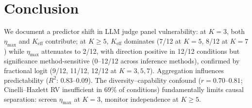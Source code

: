\section{Conclusion}

We document a predictor shift in LLM judge panel vulnerability: at $K{=}3$, both $\eta_{\max}$ and $K_{\mathrm{eff}}$ contribute; at $K{\geq}5$, $K_{\mathrm{eff}}$ dominates (7/12 at $K{=}5$, 8/12 at $K{=}7$) while $\eta_{\max}$ attenuates to 2/12, with direction positive in 12/12 conditions but significance method-sensitive (0--12/12 across inference methods), confirmed by fractional logit (9/12, 11/12, 12/12 at $K{=}3,5,7$). Aggregation influences predictability ($R^2$: 0.83--0.09). The diversity--capability confound ($r{=}0.70$--$0.81$; Cinelli--Hazlett RV insufficient in 69\% of conditions) fundamentally limits causal separation: screen $\eta_{\max}$ at $K{=}3$, monitor independence at $K{\geq}5$.
